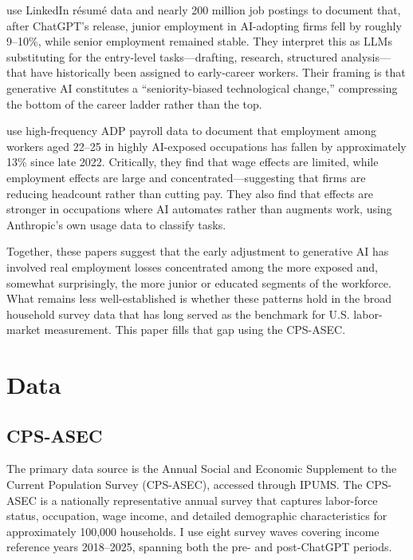 \documentclass[11pt]{article}
\begin{document}
\textcite{hosseini2025seniority} use LinkedIn résumé data and nearly 200 million job postings to document that, after ChatGPT's release, junior employment in AI-adopting firms fell by roughly 9--10\%, while senior employment remained stable. They interpret this as LLMs substituting for the entry-level tasks---drafting, research, structured analysis---that have historically been assigned to early-career workers. Their framing is that generative AI constitutes a ``seniority-biased technological change,'' compressing the bottom of the career ladder rather than the top.

\textcite{brynjolfsson2025canaries} use high-frequency ADP payroll data to document that employment among workers aged 22--25 in highly AI-exposed occupations has fallen by approximately 13\% since late 2022. Critically, they find that wage effects are limited, while employment effects are large and concentrated---suggesting that firms are reducing headcount rather than cutting pay. They also find that effects are stronger in occupations where AI automates rather than augments work, using Anthropic's own usage data to classify tasks.

Together, these papers suggest that the early adjustment to generative AI has involved real employment losses concentrated among the more exposed and, somewhat surprisingly, the more junior or educated segments of the workforce. What remains less well-established is whether these patterns hold in the broad household survey data that has long served as the benchmark for U.S. labor-market measurement. This paper fills that gap using the CPS-ASEC.

\section{Data}
\label{sec:data}

\subsection{CPS-ASEC}

The primary data source is the Annual Social and Economic Supplement to the Current Population Survey (CPS-ASEC), accessed through IPUMS. The CPS-ASEC is a nationally representative annual survey that captures labor-force status, occupation, wage income, and detailed demographic characteristics for approximately 100,000 households. I use eight survey waves covering income reference years 2018--2025, spanning both the pre- and post-ChatGPT periods.
\end{document}
